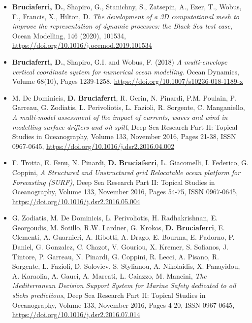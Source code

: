 \documentclass[a4paper, oneside, final]{scrartcl}
\begin{document}
\begin{itemize}
\item \textbf{Bruciaferri, D.}, Shapiro, G., Stanichny, S., Zatsepin, A., Ezer, T., Wobus, F., Francis, X., Hilton, D. \textit{The development of a 3D computational mesh to improve the representation of dynamic processes: the Black Sea test case}, Ocean Modelling, 146 (2020), 101534, \url{https://doi.org/10.1016/j.ocemod.2019.101534}
\item \textbf{Bruciaferri, D.}, Shapiro, G.I. and Wobus, F. (2018) \textit{A multi-envelope vertical coordinate system for numerical ocean modelling}. Ocean Dynamics, Volume 68(10), Pages 1239-1258, \url{https://doi.org/10.1007/s10236-018-1189-x}  
\item M. De Dominicis, \textbf{D. Bruciaferri}, R. Gerin, N. Pinardi, P.M. Poulain, P. Garreau, G. Zodiatis, L. Perivoliotis, L. Fazioli, R. Sorgente, C. Manganiello, \textit{A multi-model assessment of the impact of currents, waves and wind in modelling surface drifters and oil spill}, Deep Sea Research Part II: Topical Studies in Oceanography, Volume 133, November 2016, Pages 21-38, ISSN 0967-0645, \url{https://doi.org/10.1016/j.dsr2.2016.04.002} 
\item F. Trotta, E. Fenu, N. Pinardi, \textbf{D. Bruciaferri}, L. Giacomelli, I. Federico, G. Coppini, \textit{A Structured and Unstructured grid Relocatable ocean platform for Forecasting (SURF)}, Deep Sea Research Part II: Topical Studies in Oceanography, Volume 133, November 2016, Pages 54-75, ISSN 0967-0645, \url{https://doi.org/10.1016/j.dsr2.2016.05.004}
\item G. Zodiatis, M. De Dominicis, L. Perivoliotis, H. Radhakrishnan, E. Georgoudis, M. Sotillo, R.W. Lardner, G. Krokos, \textbf{D. Bruciaferri}, E. Clementi, A. Guarnieri, A. Ribotti, A. Drago, E. Bourma, E. Padorno, P. Daniel, G. Gonzalez, C. Chazot, V. Gouriou, X. Kremer, S. Sofianos, J. Tintore, P. Garreau, N. Pinardi, G. Coppini, R. Lecci, A. Pisano, R. Sorgente, L. Fazioli, D. Soloviev, S. Stylianou, A. Nikolaidis, X. Panayidou, A. Karaolia, A. Gauci, A. Marcati, L. Caiazzo, M. Mancini, \textit{The Mediterranean Decision Support System for Marine Safety dedicated to oil slicks predictions}, Deep Sea Research Part II: Topical Studies in Oceanography, Volume 133, November 2016, Pages 4-20, ISSN 0967-0645, \url{https://doi.org/10.1016/j.dsr2.2016.07.014}
\end{itemize}
\end{document}
